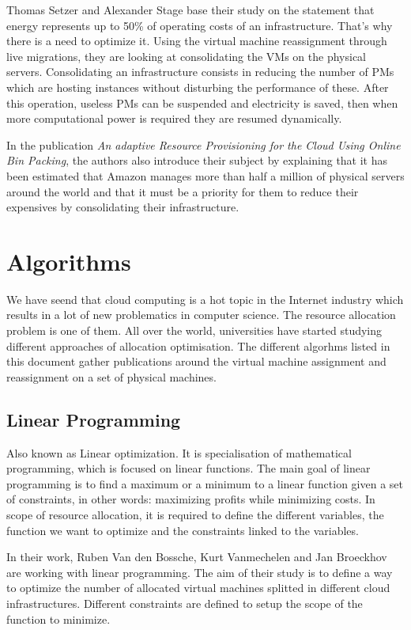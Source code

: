 \documentclass[a4paper,11pt]{article}
\begin{document}
Thomas Setzer and Alexander Stage base their study on the statement that energy
represents up to 50\% of operating costs of an
infrastructure\cite{reassignment:electricitysaving}. That's why there is a need
to optimize it. Using the virtual machine reassignment through live migrations,
they are looking at consolidating the VMs on the physical servers.
Consolidating an infrastructure consists in reducing the number of PMs which
are hosting instances without disturbing the performance of these.  After this
operation, useless PMs can be suspended and electricity is saved, then when
more computational power is required they are resumed dynamically.

In the publication \textit{An adaptive Resource Provisioning for the Cloud
Using Online Bin Packing}\cite{reassignment:binpacking1}, the authors also
introduce their subject by explaining that it has been estimated that Amazon
manages more than half a million of physical servers around the world and that
it must be a priority for them to reduce their expensives by consolidating
their infrastructure.

\section{Algorithms}

We have seend that cloud computing is a hot topic in the Internet industry
which results in a lot of new problematics in computer science. The resource
allocation problem is one of them. All over the world, universities have
started studying different approaches of allocation optimisation. The different
algorhms listed in this document gather publications around the virtual machine
assignment and reassignment on a set of physical machines.

\subsection{Linear Programming}

Also known as Linear optimization. It is specialisation of mathematical
programming, which is focused on linear functions. The main goal of linear
programming is to find a maximum or a minimum to a linear function given a set
of constraints, in other words: maximizing profits while minimizing costs. In
scope of resource allocation, it is required to define the different variables,
the function we want to optimize and the constraints linked to the variables.

In their work, Ruben Van den Bossche, Kurt Vanmechelen and Jan
Broeckhov\cite{allocation:hybrid} are working with linear programming. The aim
of their study is to define a way to optimize the number of allocated virtual
machines splitted in different cloud infrastructures.  Different constraints
are defined to setup the scope of the function to minimize.
\end{document}
